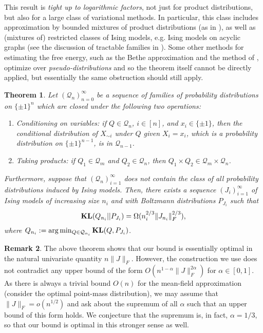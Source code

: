 \documentclass[final, 12pt]{colt2018}
\newcommand{\KL}{\mathop{\bf KL\/}}
\newtheorem{theorem}{Theorem}[section]
\theoremstyle{definition}
\newtheorem{remark}[theorem]{Remark}
\theoremstyle{plain}
\begin{document}
This result is \emph{tight up to logarithmic factors}, not just for product distributions, but also for a large class of variational methods. In particular, this class includes approximation by bounded mixtures of product distributions (as in \citet{jaakkola1998improving}),
as well as (mixtures of) restricted classes of Ising models, e.g. Ising models on acyclic graphs (see the discussion of tractable families in \citet{wainwright-jordan-variational}). Some other
methods for estimating the free energy, such as the Bethe approximation and the method of \citet{risteski-ising}, optimize over \emph{pseudo-distributions} and so the theorem itself cannot be directly applied, but essentially the same obstruction should still apply.
\begin{theorem}\label{thm:variational-lb}
Let $(\mathcal{Q}_n)_{n = 0}^{\infty}$ be a sequence of families
of probability distributions on $\{\pm 1\}^n$ which are closed under the following two operations:
\begin{enumerate}
\item Conditioning on variables: if
  $Q \in \mathcal{Q}_n$, $i \in [n]$, and $x_i \in \{\pm 1\}$, then the conditional distribution of $X_{\sim i}$ under $Q$ given $X_i = x_i$, which is a
  probability distribution on $\{\pm 1\}^{n - 1}$, is in $\mathcal{Q}_{n - 1}$.
\item Taking products: if $Q_1 \in \mathcal{Q}_m$ and $Q_2 \in \mathcal{Q}_n$,
  then $Q_1 \times Q_2 \in \mathcal{Q}_m \times \mathcal{Q}_n$.
\end{enumerate}
Furthermore, suppose that $(\mathcal{Q}_n)_{i = 1}^\infty$ does not contain the class of all probability
distributions induced by Ising models. Then, there exists a sequence $(J_i)_{i = 1}^{\infty}$ of Ising models of increasing size $n_i$ and with Boltzmann distributions $P_{J_i}$ %
such that 
\[ \KL(Q_{n_i} || P_{J_i}) = \Omega(n_i^{2/3}\|J_{n_i}\|_F^{2/3}), \]
where $Q_{n_i} := \arg\min_{Q \in \mathcal{Q}_{n_i}} \KL(Q,P_{J_i})$.
\end{theorem}
\begin{remark}\label{rmk:optimal-bound-question}
The above theorem shows that our bound is essentially optimal in the natural univariate quantity $n \|J\|_F$. However, the construction we use does not contradict any upper bound of the form $O(n^{1 - \alpha} \|J\|_F^{2 \alpha})$ for $\alpha \in [0,1]$. As there is always a trivial bound $O(n)$ for the mean-field approximation (consider the optimal point-mass distribution), we may assume that $\|J\|_F = o(n^{1/2})$ and ask about the supremum of all $\alpha$ such that an upper bound of this form holds. We conjecture that the supremum is, in fact, $\alpha = 1/3$, so that our bound is optimal in this stronger sense as well.
\end{remark}
\end{document}
